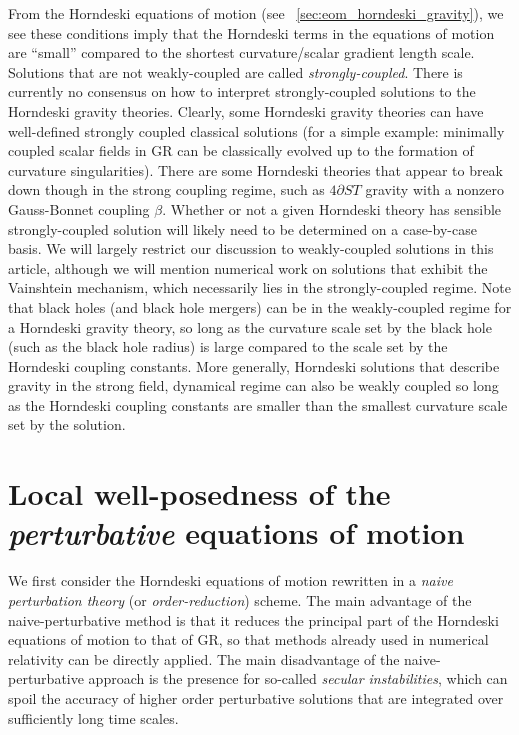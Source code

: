 \documentclass{ws-ijmpd}
\begin{document}
From the Horndeski equations of motion 
(see ~\ref{sec:eom_horndeski_gravity}), we see these conditions
imply that the Horndeski terms in the equations of motion
are ``small'' compared to the shortest curvature/scalar gradient length scale. 
Solutions that are not weakly-coupled are called \emph{strongly-coupled}.
There is currently
no consensus on how to interpret strongly-coupled solutions
to the Horndeski gravity theories. 
Clearly, some Horndeski gravity theories can have well-defined strongly coupled
classical solutions (for a simple example: minimally coupled scalar fields in GR
can be classically evolved up to the formation of 
curvature singularities\cite{Choptuik:1992jv}).
There are some Horndeski theories that appear to break down though in the
strong coupling regime, such as $4\partial ST$ gravity with a nonzero
Gauss-Bonnet coupling 
$\beta$\cite{Ripley:2019hxt,Ripley:2019irj,Ripley:2019aqj,Ripley:2020vpk,
East:2021bqk,Corelli:2022pio,Corelli:2022phw}.
Whether or not a given Horndeski theory has sensible strongly-coupled solution
will likely need to be determined on a case-by-case basis.
We will largely restrict our discussion to weakly-coupled solutions
in this article, although we will mention numerical work on solutions 
that exhibit the Vainshtein mechanism, which necessarily lies
in the strongly-coupled regime\cite{VAINSHTEIN1972393,Joyce:2014kja}.
Note that black holes (and black hole mergers) can be in the weakly-coupled
regime for a Horndeski gravity theory, so long as the curvature scale
set by the black hole (such as the black hole radius) is large compared
to the scale set by the Horndeski coupling constants.
More generally, Horndeski solutions that describe gravity in the 
strong field, dynamical regime can also be weakly coupled so long
as the Horndeski coupling constants are smaller than the smallest curvature
scale set by the solution.

\section{Local well-posedness of the \emph{perturbative} equations of motion
\label{sec:perturbative_well_posedness}
}
We first consider the Horndeski equations of motion rewritten in
a \emph{naive perturbation theory} (or \emph{order-reduction}) scheme.
The main advantage of the naive-perturbative method is that it reduces
the principal part of the Horndeski equations of motion to that
of GR, so that methods already used in numerical relativity can be
directly applied.
The main disadvantage of the naive-perturbative approach is the presence 
for so-called \emph{secular instabilities}, which 
can spoil the accuracy of higher order perturbative solutions that are integrated
over sufficiently long time scales.
\end{document}
